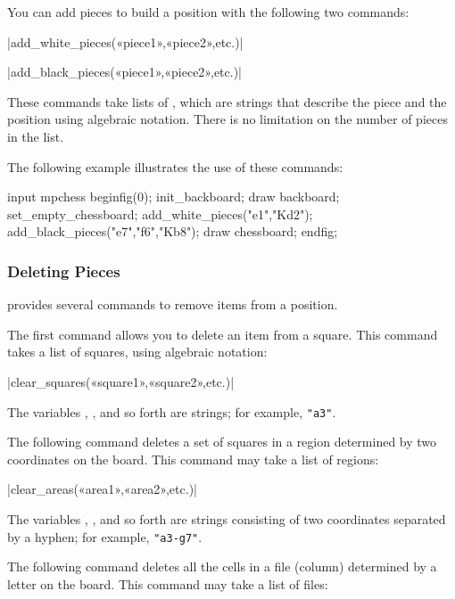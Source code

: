 \documentclass[english]{ltxdoc}
\begin{document}
You can add pieces to build a position with the following two commands:

\commande|add_white_pieces(«piece1»,«piece2»,etc.)|\smallskip


\commande|add_black_pieces(«piece1»,«piece2»,etc.)|\smallskip

These commands take lists of \textbf{}, which are strings
that describe the piece and the position using
algebraic notation. There is no limitation on the number of pieces in the list.

The following example illustrates the use of these commands:

\begin{ExempleMP}
input mpchess
beginfig(0);
init_backboard;
draw backboard;
set_empty_chessboard;
add_white_pieces("e1","Kd2");
add_black_pieces("e7","f6","Kb8");
draw chessboard;
endfig;
\end{ExempleMP}


\subsubsection{Deleting Pieces}

\mpchess provides several commands to remove items from a position.

The first command allows you to delete an item from a square. This command takes
a list of squares, using algebraic notation:

\commande|clear_squares(«square1»,«square2»,etc.)|\smallskip

The variables \textbf{}, \textbf{},
and so forth are strings; for example, \lstinline+"a3"+.
\medskip

The following command deletes a set of squares in a region
determined by two coordinates on the board. This command may take
a list of regions:

\commande|clear_areas(«area1»,«area2»,etc.)|\smallskip

The variables \textbf{}, \textbf{}, and so
forth are strings consisting of two coordinates separated by a hyphen; for example, \lstinline+"a3-g7"+.
\medskip

The following command deletes all the cells in a file (column) determined by a
letter on the board. This command may take a list of files:
\end{document}
